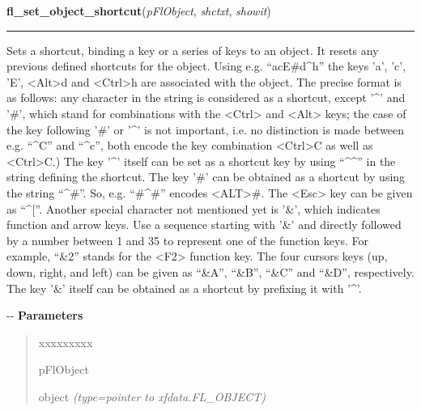 \hspace{.8\funcindent}\begin{boxedminipage}{\funcwidth}

    \raggedright \textbf{fl\_set\_object\_shortcut}(\textit{pFlObject}, \textit{shctxt}, \textit{showit})

    \vspace{-1.5ex}

    \rule{\textwidth}{0.5\fboxrule}
\setlength{\parskip}{2ex}

Sets a shortcut, binding a key or a series of keys to an object. It
resets any previous defined shortcuts for the object. Using e.g. ``acE\#d\textasciicircum{}h''
the keys 'a', 'c', 'E', <Alt>d and <Ctrl>h are associated with the object.
The precise format is as follows: any character in the string is considered
as a shortcut, except '\textasciicircum{}' and '\#', which stand for combinations with the
<Ctrl> and <Alt> keys; the case of the key following '\#' or '\textasciicircum{}' is not
important, i.e. no distinction is made between e.g. ``\textasciicircum{}C'' and ``\textasciicircum{}c'', both
encode the key combination <Ctrl>C as well as <Ctrl>C.) The key '\textasciicircum{}' itself
can be set as a shortcut key by using ``\textasciicircum{}\textasciicircum{}'' in the string defining the
shortcut. The key '\#' can be obtained as a shortcut by using the string
``\textasciicircum{}\#''. So, e.g. ``\#\textasciicircum{}\#'' encodes <ALT>\#. The <Esc> key can be given as ``\textasciicircum{}{[}''.
Another special character not mentioned yet is '\&', which indicates
function and arrow keys. Use a sequence starting with '\&' and directly
followed by a number between 1 and 35 to represent one of the function
keys. For example, ``\&2'' stands for the <F2> function key. The four cursors
keys (up, down, right, and left) can be given as ``\&A'', ``\&B'', ``\&C'' and ``\&D'',
respectively. The key '\&' itself can be obtained as a shortcut by
prefixing it with '\textasciicircum{}'.

-{}-
\setlength{\parskip}{1ex}
      \textbf{Parameters}
      \vspace{-1ex}

      \begin{quote}
        \begin{Ventry}{xxxxxxxxx}

          \item[pFlObject]


object
            {\it (type=pointer to xfdata.FL\_OBJECT)}


\end{Ventry}
\end{quote}
\end{boxedminipage}

